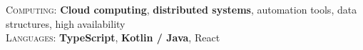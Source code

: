 %
%
%


    \textsc{Computing:} \hspace{0.5cm} \textbf{Cloud computing}, \textbf{distributed systems}, automation tools, data structures, high availability \\
    \textsc{ Languages:} \hspace{0.6cm} \textbf{TypeScript}, \textbf{Kotlin / Java}, React \\
